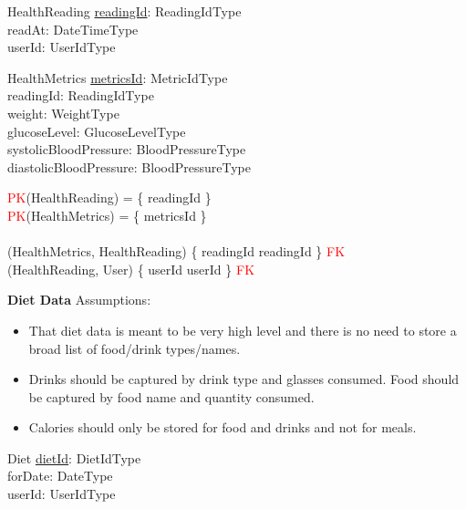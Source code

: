 \documentclass{article}
\begin{document}
\begin{schema}{HealthReading}
	\underline{readingId}: ReadingIdType \\
    readAt: DateTimeType \\
    userId: UserIdType \\
\end{schema}
\vspace{-0.75cm}
\begin{schema}{HealthMetrics}
    \underline{metricsId}: MetricIdType \\
    readingId: ReadingIdType \\
    weight: WeightType \\ 
    glucoseLevel: GlucoseLevelType \\
    systolicBloodPressure: BloodPressureType \\
    diastolicBloodPressure: BloodPressureType \\
\end{schema}
\begin{zed}
\textcolor{red}{PK}(HealthReading) = \{ readingId \} \\ 
\textcolor{red}{PK}(HealthMetrics) = \{ metricsId \} \\
\newline \\ 
(HealthMetrics, HealthReading) \mapsto \{ readingId \mapsto readingId \} \in \textcolor{red}{FK} \\
(HealthReading, User) \mapsto \{ userId \mapsto userId \} \in \textcolor{red}{FK} \\
\end{zed}
\newline
\textbf{Diet Data}
\newline \newline Assumptions:
\begin{itemize}
  \item That diet data is meant to be very high level and there is no need to store a broad list of food/drink types/names. 
  \item Drinks should be captured by drink type and glasses consumed. Food should be captured by food name and quantity consumed.
  \item Calories should only be stored for food and drinks and not for meals. 
\end{itemize}
\begin{schema}{Diet}
  \underline{dietId}: DietIdType \\
  forDate: DateType \\
  userId: UserIdType \\
\end{schema}
\end{document}
